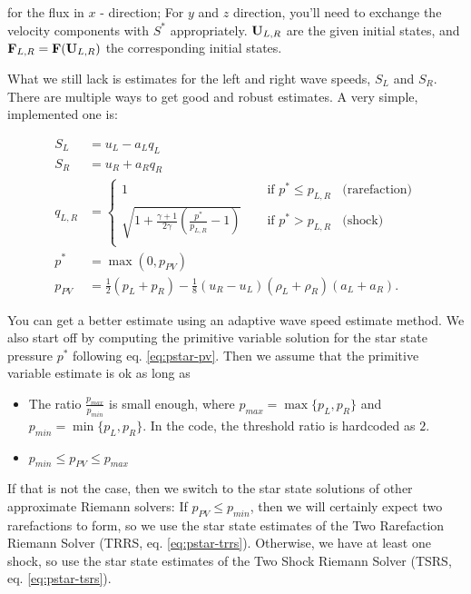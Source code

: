 for the flux in $x$ - direction;
For $y$ and $z$ direction, you'll need to exchange the velocity components with $S^*$ appropriately.
$\mathbf{U}_{L,R}$ are the given initial states, and $\mathbf{F}_{L,R} = \mathbf{F}(\mathbf{U}_{L,R})$ the corresponding initial states.



What we still lack is estimates for the left and right wave speeds, $S_L$ and $S_R$.
There are multiple ways to get good and robust estimates.
A very simple, implemented one is:

\begin{align}
	S_L  &= u_L - a_L q_L \\
	S_R  &= u_R + a_R q_R \\
	q_{L,R} &= 
		\begin{cases}
			1	~~~~ & \text{ if } p^* \leq p_{L,R} ~~~~ \text{(rarefaction)}\\
			\sqrt{1 + \frac{\gamma + 1}{2 \gamma} \left(\frac{p^*}{p_{L,R}} - 1 \right)}	~~~~ & \text{ if } p^* > p_{L,R} ~~~~ \text{(shock)}\\
		\end{cases} \\
	p^* &= \max(0, p_{PV})\\
	p_{PV} &= \frac{1}{2} (p_L + p_R) - \frac{1}{8} (u_R - u_L)(\rho_L + \rho_R)(a_L + a_R) \label{eq:pstar-pv}.
\end{align}



You can get a better estimate using an adaptive wave speed estimate method.
We also start off by computing the primitive variable solution for the star state pressure $p^*$ following eq. \ref{eq:pstar-pv}.
Then we assume that the primitive variable estimate is ok as long as

\begin{itemize}
	\item The ratio $\frac{p_{max}}{p_{min}}$ is small enough, where $p_{max} = \max \{ p_L, p_R \}$ and $p_{min} = \min \{ p_L, p_R \}$.
			In the code, the threshold ratio is hardcoded as $2$.
	\item $p_{min} \leq p_{PV} \leq p_{max}$
\end{itemize}

If that is not the case, then we switch to the star state solutions of other approximate Riemann solvers:
If $p_{PV} \leq p_{min}$, then we will certainly expect two rarefactions to form, so we use the star state estimates of the Two Rarefaction Riemann Solver (TRRS, eq. \ref{eq:pstar-trrs}).
Otherwise, we have at least one shock, so use the star state estimates of the Two Shock Riemann Solver (TSRS, eq. \ref{eq:pstar-tsrs}).



